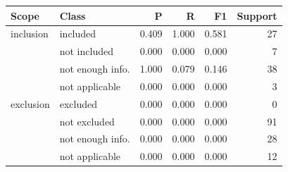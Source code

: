 \begin{tabular}{llrrrr}\toprule
Scope & Class & P & R & F1 & Support \\\midrule
inclusion & included & 0.409 & 1.000 & 0.581 & 27 \\
 & not included & 0.000 & 0.000 & 0.000 & 7 \\
 & not enough info. & 1.000 & 0.079 & 0.146 & 38 \\
 & not applicable & 0.000 & 0.000 & 0.000 & 3 \\
\midrule
exclusion & excluded & 0.000 & 0.000 & 0.000 & 0 \\
 & not excluded & 0.000 & 0.000 & 0.000 & 91 \\
 & not enough info. & 0.000 & 0.000 & 0.000 & 28 \\
 & not applicable & 0.000 & 0.000 & 0.000 & 12 \\
\bottomrule\end{tabular}
